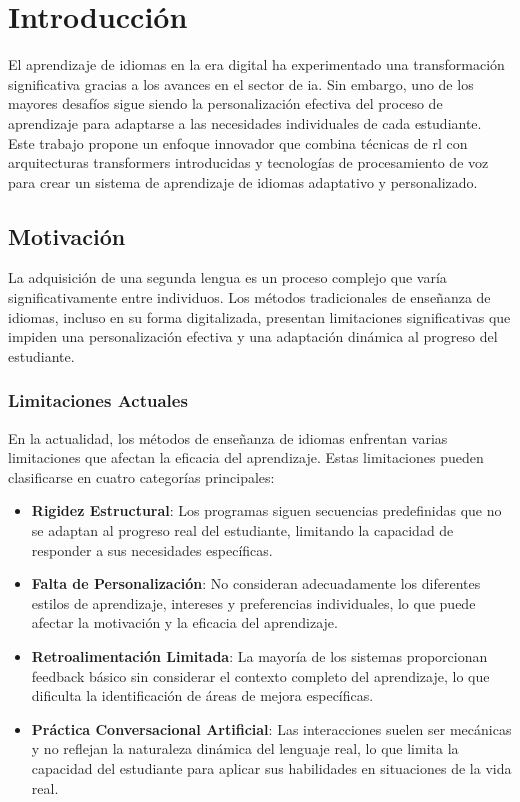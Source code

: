 \chapter{Introducción}
\label{introduccion}

El aprendizaje de idiomas en la era digital ha experimentado una transformación significativa gracias a los avances en el sector de \gls{ia}. Sin embargo, uno de los mayores desafíos sigue siendo la personalización efectiva del proceso de aprendizaje para adaptarse a las necesidades individuales de cada estudiante. Este trabajo propone un enfoque innovador que combina técnicas de \gls{rl} con arquitecturas \gls{transformers} introducidas y tecnologías de procesamiento de voz para crear un sistema de aprendizaje de idiomas adaptativo y personalizado.

\section{Motivación}
\label{motivacion}

La adquisición de una segunda lengua es un proceso complejo que varía significativamente entre individuos. Los métodos tradicionales de enseñanza de idiomas, incluso en su forma digitalizada, presentan limitaciones significativas que impiden una personalización efectiva y una adaptación dinámica al progreso del estudiante.

\subsection{Limitaciones Actuales}
\label{limitaciones-actuales}

En la actualidad, los métodos de enseñanza de idiomas enfrentan varias limitaciones que afectan la eficacia del aprendizaje. Estas limitaciones pueden clasificarse en cuatro categorías principales:

\begin{itemize}
  \item \textbf{Rigidez Estructural}: Los programas siguen secuencias predefinidas que no se adaptan al progreso real del estudiante, limitando la capacidad de responder a sus necesidades específicas.
  \item \textbf{Falta de Personalización}: No consideran adecuadamente los diferentes estilos de aprendizaje, intereses y preferencias individuales, lo que puede afectar la motivación y la eficacia del aprendizaje.
  \item \textbf{Retroalimentación Limitada}: La mayoría de los sistemas proporcionan feedback básico sin considerar el contexto completo del aprendizaje, lo que dificulta la identificación de áreas de mejora específicas.
  \item \textbf{Práctica Conversacional Artificial}: Las interacciones suelen ser mecánicas y no reflejan la naturaleza dinámica del lenguaje real, lo que limita la capacidad del estudiante para aplicar sus habilidades en situaciones de la vida real.
\end{itemize}

